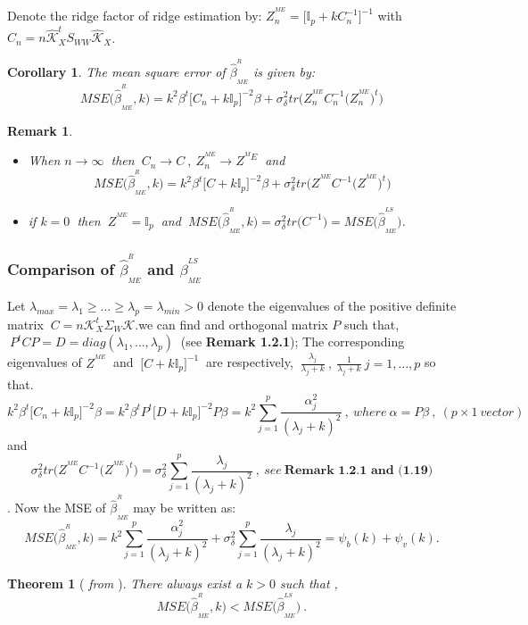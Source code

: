 \documentclass[12pt]{report}
\newtheorem{theoreme}{Theorem}[section] %
\newtheorem{remarque}{Remark}[section]
\newtheorem{corollaire}{Corollary}
\begin{document}
Denote the ridge factor of ridge estimation by: $Z^{^{ME}}_{n}=\big[\mathbb{I}_{p}+kC_{n}^{-1}\big]^{-1}$ with   $C_{n}=n\hat{\mathcal{K}}_{X}^{t}S_{WW}\hat{\mathcal{K}}_{X}$.
\begin{corollaire}
	The mean square error of $\hat{\beta}^{^{R}}_{_{ME}}$ is given by:
	\begin{equation}
		MSE\big(\hat{\beta}^{^{R}}_{_{ME}},k\big)=k^{2}\beta^{t}\big[C_{n}+k\mathbb{I}_{p}\big]^{-2}\beta+\sigma_{\delta}^{2} tr\big(Z^{^{ME}}_{n}C_{n}^{-1}\big(Z^{^{ME}}_{n}\big)^{t}\big)
	\end{equation}
	\end{corollaire}
\begin{remarque}
	\begin{itemize}
		\item	When $n\rightarrow \infty\ $ then $\ C_{n}\rightarrow C\ , \ Z^{^{ME}}_{n}\rightarrow Z^{^ME}\  $ and  $$	MSE\big(\hat{\beta}^{^{R}}_{_{ME}},k\big)=k^{2}\beta^{t}\big[C+k\mathbb{I}_{p}\big]^{-2}\beta+\sigma_{\delta}^{2} tr\big(Z^{^{ME}}C^{-1}\big(Z^{^{ME}}\big)^{t}\big)$$
		\item if $k=0\ $ then $\ Z^{^{ME}}=\mathbb{I}_{p}\ $ and $\ MSE\big(\hat{\beta}^{^{R}}_{_{ME}},k\big)=\sigma_{\delta}^{2}tr\big(C^{-1}\big)=MSE\big(\hat{\beta}^{^{LS}}_{_{ME}}\big)$.
	\end{itemize}
\end{remarque}
\subsubsection{Comparison of $\hat{\beta}^{^{R}}_{_{ME}}$ and $\beta^{^{LS}}_{_{ME}}$}
Let $\lambda_{max}=\lambda_{1}\geq \dots \geq \lambda_{p}=\lambda_{min}>0$ denote the eigenvalues of the positive definite matrix $\ C=n\mathcal{K}_{X}^{t}\Sigma_{W}\mathcal{K}$.we can find and orthogonal matrix $P$ such that,$\ P^{t}CP=D=diag(\lambda_{1},\dots,\lambda_{p})\ $ (see \textbf{Remark 1.2.1}); The corresponding eigenvalues of $Z^{^{ME}}\ $ and $\ \big[C+k\mathbb{I}_{p}\big]^{-1}\ $ are respectively, $\ \frac{\lambda_{j}}{\lambda_{j}+k}\ ,\ \frac{1}{\lambda_{j}+k}\ j=1,\dots,p$ so that.
$$ k^{2}\beta^{t}\big[C_{n}+k\mathbb{I}_{p}\big]^{-2}\beta=k^{2}\beta^{t}P^{t}\big[D+k\mathbb{I}_{p}\big]^{-2}P\beta=k^{2}\sum_{j=1}^{p}\frac{\alpha_{j}^{2}}{(\lambda_{j}+k)^{2}}\ ,\ where\ \alpha=P\beta\ ,\ (p\times1\ vector)$$
and
$$ \sigma_{\delta}^{2} tr\big(Z^{^{ME}}C^{-1}\big(Z^{^{ME}}\big)^{t}\big)=\sigma_{\delta}^{2} \sum_{j=1}^{p}\frac{\lambda_{j}}{(\lambda_{j}+k)^{2}}\ ,\ see\ \textbf{Remark 1.2.1 and (1.19)}$$.
Now the MSE of $\hat{\beta}^{^{R}}_{_{ME}}$ may be written as:
\begin{equation}
	MSE\big(\hat{\beta}^{^{R}}_{_{ME}},k\big)=k^{2}\sum_{j=1}^{p}\frac{\alpha_{j}^{2}}{(\lambda_{j}+k)^{2}}+\sigma_{\delta}^{2} \sum_{j=1}^{p}\frac{\lambda_{j}}{(\lambda_{j}+k)^{2}}=\psi_{b}(k)+\psi_{v}(k).
	\label{f60}
\end{equation}
\begin{theoreme}[ \textit{from \cite{nref6}}]
	There always exist a $k>0$ such that ,
	\begin{equation}
		MSE\big(\hat{\beta}^{^{R}}_{_{ME}},k\big)< MSE\big(\hat{\beta}^{^{LS}}_{_{ME}}\big)\ .
	\end{equation}
\end{theoreme}
\end{document}
